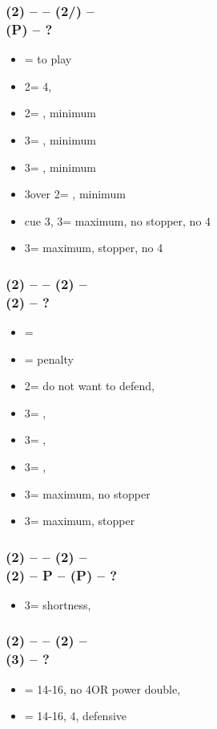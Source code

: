 \documentclass[12pt, a4paper]{report}
\begin{document}
{{        \subsubsection*{(2\diams) -- \dbl -- (2\hearts/\spades) -- \dbl \\
                        (P) -- ?}        
        \begin{itemize}
            \item \pass = to play
            \item 2\spades = 4\spades, \fonce
            \item 2\nt = \nat, minimum
            \item 3\clubs = \nat, minimum
            \item 3\diams = \nat, minimum
            \item 3\hearts over 2\spades = \nat, minimum
            \item cue 3\hearts, 3\spades = maximum, no stopper, no 4\spades
            \item 3\nt = maximum, stopper, no 4\spades
        \end{itemize}

        \subsubsection*{(2\diams) -- \dbl -- (2\hearts) -- \dbl \\
                        (2\spades) -- ?}        
        \begin{itemize}
            \item \pass = \fonce
            \item \dbl = penalty
            \item 2\nt = do not want to defend, \gf
            \item 3\clubs = \nat, \gf
            \item 3\diams = \nat, \gf
            \item 3\hearts = \nat, \gf
            \item 3\spades = maximum, no \spades stopper
            \item 3\nt = maximum, stopper
        \end{itemize}

        \subsubsection*{(2\diams) -- \dbl -- (2\hearts) -- \dbl \\
                        (2\spades) -- P -- (P) -- ?}
        \begin{itemize}
            \item 3\spades = \spades shortness, \gf %
        \end{itemize}

        \subsubsection*{(2\diams) -- \dbl -- (2\spades) -- \dbl \\
                        (3\hearts) -- ?}  
        \begin{itemize}
            \item \pass = 14-16, no 4\spades OR power double, \fonce
            \item \dbl = 14-16, 4\spades, defensive
            
        \end{itemize}
    }
}
\end{document}
